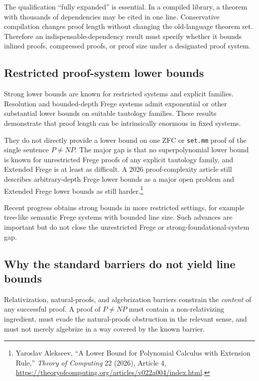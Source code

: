 \documentclass[11pt,letterpaper]{article}
\theoremstyle{named}
\begin{document}
The qualification ``fully expanded'' is essential. In a compiled library, a theorem with thousands of dependencies may be cited in one line. Conservative compilation changes proof length without changing the old-language theorem set. Therefore an indispensable-dependency result must specify whether it bounds inlined proofs, compressed proofs, or proof size under a designated proof system.

\subsection{Restricted proof-system lower bounds}

Strong lower bounds are known for restricted systems and explicit families. Resolution and bounded-depth Frege systems admit exponential or other substantial lower bounds on suitable tautology families. These results demonstrate that proof length can be intrinsically enormous in fixed systems.

They do not directly provide a lower bound on one ZFC or \texttt{set.mm} proof of the single sentence $P\ne NP$. The major gap is that no superpolynomial lower bound is known for unrestricted Frege proofs of any explicit tautology family, and Extended Frege is at least as difficult. A 2026 proof-complexity article still describes arbitrary-depth Frege lower bounds as a major open problem and Extended Frege lower bounds as still harder.\footnote{Yaroslav Alekseev, ``A Lower Bound for Polynomial Calculus with Extension Rule,'' \emph{Theory of Computing} 22 (2026), Article 4, \url{https://theoryofcomputing.org/articles/v022a004/index.html}.}

Recent progress obtains strong bounds in more restricted settings, for example tree-like semantic Frege systems with bounded line size. Such advances are important but do not close the unrestricted Frege or strong-foundational-system gap.

\subsection{Why the standard barriers do not yield line bounds}

Relativization, natural-proofs, and algebrization barriers constrain the \emph{content} of any successful proof. A proof of $P\ne NP$ must contain a non-relativizing ingredient, must evade the natural-proofs obstruction in the relevant sense, and must not merely algebrize in a way covered by the known barrier.
\end{document}
